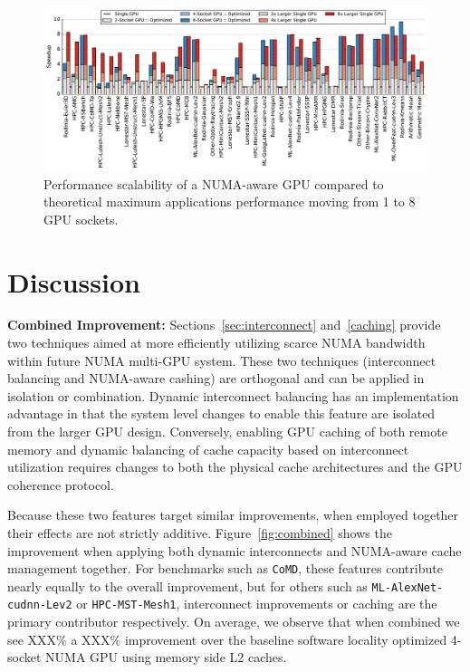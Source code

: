 \begin{figure}[t]
    \centering
    \includegraphics[width=1.0\textwidth]{figures/plot_scalability_mgpu_WB.pdf}
    \caption{Performance scalability of a NUMA-aware GPU compared to theoretical 
    maximum applications performance moving from 1 to 8 GPU sockets.}
    \label{fig:scalability}
    \vspace{-.2in}
\end{figure}

\section {Discussion}
\label{sec:discussion}
\textbf{Combined Improvement:} Sections~\ref{sec:interconnect} and~\ref{caching} provide two techniques
aimed at more efficiently utilizing scarce NUMA bandwidth within future
NUMA multi-GPU system. These two techniques (interconnect balancing and NUMA-aware
cashing) are orthogonal and can be applied in isolation or combination.  Dynamic 
interconnect balancing has an 
implementation advantage in that the system level changes to enable this feature 
are isolated from the larger GPU design.  Conversely, enabling GPU caching of 
both remote memory and dynamic balancing of cache capacity based on interconnect 
utilization requires changes to both the physical cache architectures and the 
GPU coherence protocol.

Because these two features target similar improvements, when employed together 
their effects are not strictly additive.  Figure~\ref{fig:combined} shows the 
improvement when applying both dynamic interconnects and NUMA-aware cache 
management together.  For benchmarks such as \texttt{CoMD}, these features 
contribute nearly equally to the overall improvement, but for others such as 
\texttt{ML-AlexNet-cudnn-Lev2} or \texttt{HPC-MST-Mesh1}, interconnect 
improvements or caching are the primary contributor respectively.  On average, 
we observe that when combined we see XXX\% a XXX\% improvement over the baseline 
software locality optimized 4-socket NUMA GPU using memory side L2 caches.

